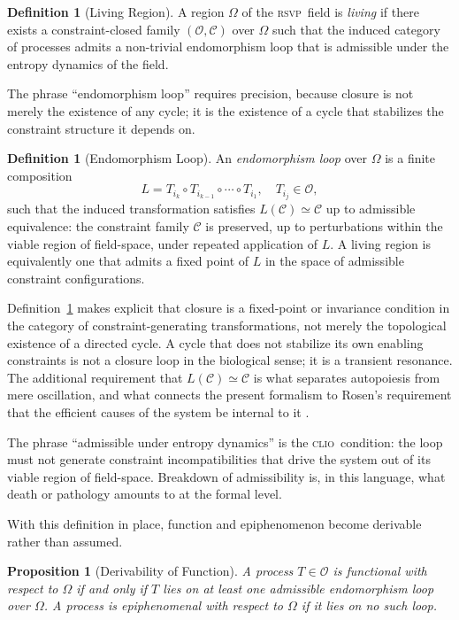 \documentclass[11pt, a4paper]{article}
\theoremstyle{plain}
\newtheorem{proposition}[theorem]{Proposition}
\theoremstyle{definition}
\newtheorem{definition}[theorem]{Definition}
\theoremstyle{remark}
\newcommand{\CLIO}{\textsc{clio}}
\newcommand{\RSVP}{\textsc{rsvp}}
\begin{document}
\begin{definition}[Living Region]
A region $\Omega$ of the \RSVP\ field is \emph{living} if there exists a constraint-closed family $(\mathcal{O}, \mathcal{C})$ over $\Omega$ such that the induced category of processes admits a non-trivial endomorphism loop that is admissible under the entropy dynamics of the field.
\end{definition}

The phrase ``endomorphism loop'' requires precision, because closure is not merely the existence of any cycle; it is the existence of a cycle that stabilizes the constraint structure it depends on.

\begin{definition}[Endomorphism Loop]
\label{def:endoloop}
An \emph{endomorphism loop} over $\Omega$ is a finite composition
\[
L = T_{i_k} \circ T_{i_{k-1}} \circ \cdots \circ T_{i_1},
\quad T_{i_j} \in \mathcal{O},
\]
such that the induced transformation satisfies $L(\mathcal{C}) \simeq \mathcal{C}$ up to admissible equivalence: the constraint family $\mathcal{C}$ is preserved, up to perturbations within the viable region of field-space, under repeated application of $L$. A living region is equivalently one that admits a fixed point of $L$ in the space of admissible constraint configurations.
\end{definition}

Definition~\ref{def:endoloop} makes explicit that closure is a fixed-point or invariance condition in the category of constraint-generating transformations, not merely the topological existence of a directed cycle. A cycle that does not stabilize its own enabling constraints is not a closure loop in the biological sense; it is a transient resonance. The additional requirement that $L(\mathcal{C}) \simeq \mathcal{C}$ is what separates autopoiesis from mere oscillation, and what connects the present formalism to Rosen's requirement that the efficient causes of the system be internal to it \cite{rosen1991}.

The phrase ``admissible under entropy dynamics'' is the \CLIO\ condition: the loop must not generate constraint incompatibilities that drive the system out of its viable region of field-space. Breakdown of admissibility is, in this language, what death or pathology amounts to at the formal level.

With this definition in place, function and epiphenomenon become derivable rather than assumed.

\begin{proposition}[Derivability of Function]
A process $T \in \mathcal{O}$ is \emph{functional} with respect to $\Omega$ if and only if $T$ lies on at least one admissible endomorphism loop over $\Omega$. A process is \emph{epiphenomenal} with respect to $\Omega$ if it lies on no such loop.
\end{proposition}
\end{document}
